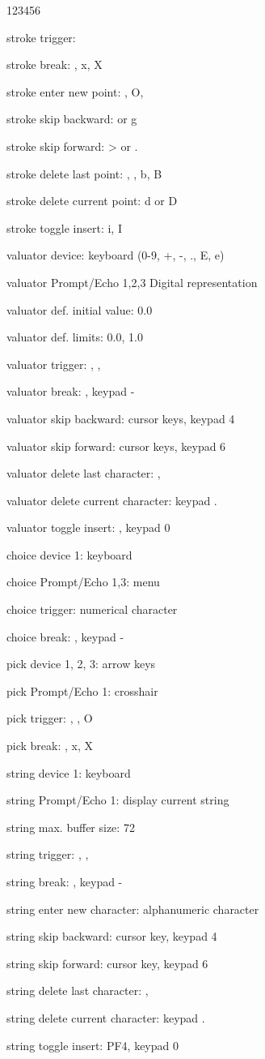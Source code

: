 \begin{DLtt}{123456}
\item[stroke trigger:]
\item[stroke break:], x, X
\item[stroke enter new point:], O, 
\item[stroke skip backward:]\Lit{<} or g
\item[stroke skip forward:]> or .
\item[stroke delete last point:], , b, B
\item[stroke delete current point:]d or D
\item[stroke toggle insert:]i, I
\item[valuator device:]keyboard (0-9, +, -, ., E, e)
\item[valuator Prompt/Echo 1,2,3]Digital representation
\item[valuator def. initial value:]0.0
\item[valuator def. limits:]0.0, 1.0
\item[valuator trigger:], , 
\item[valuator break:], keypad -
\item[valuator skip backward:]cursor keys, keypad 4
\item[valuator skip forward:]cursor keys, keypad 6
\item[valuator delete last character:], 
\item[valuator delete current character:]keypad .
\item[valuator toggle insert:], keypad 0
\item[choice device 1:]keyboard
\item[choice Prompt/Echo 1,3:]menu
\item[choice trigger:]numerical character 
\item[choice break:], keypad -
\item[pick device 1, 2, 3:]arrow keys
\item[pick Prompt/Echo 1:]crosshair
\item[pick trigger:], , O
\item[pick break:], x, X
\item[string device 1:]keyboard
\item[string Prompt/Echo 1:]display current string
\item[string max. buffer size:]72
\item[string trigger:], , 
\item[string break:], keypad -
\item[string enter new character:]alphanumeric character
\item[string skip backward:]cursor key, keypad 4
\item[string skip forward:]cursor key, keypad 6
\item[string delete last character:], 
\item[string delete current character:]keypad .
\item[string toggle insert:]PF4, keypad 0
\end{DLtt}
